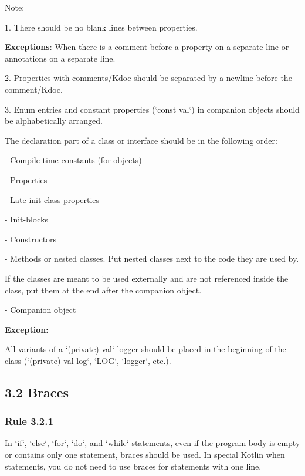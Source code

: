 Note:

1.	There should be no blank lines between properties. 

\textbf{Exceptions}: When there is a comment before a property on a separate line or annotations on a separate line.

2.	Properties with comments/Kdoc should be separated by a newline before the comment/Kdoc.

3.	Enum entries and constant properties (`const val`) in companion objects should be alphabetically arranged.



The declaration part of a class or interface should be in the following order:

- Compile-time constants (for objects)

- Properties

- Late-init class properties

- Init-blocks

- Constructors

- Methods or nested classes. Put nested classes next to the code they are used by.

If the classes are meant to be used externally and are not referenced inside the class, put them at the end after the companion object.

- Companion object



\textbf{Exception:}

All variants of a `(private) val` logger should be placed in the beginning of the class (`(private) val log`, `LOG`, `logger`, etc.).



\subsection*{\textbf{3.2 Braces}}

\subsubsection*{\textbf{Rule 3.2.1}}
\leavevmode\newline



In `if`, `else`, `for`, `do`, and `while` statements, even if the program body is empty or contains only one statement, braces should be used. In special Kotlin when statements, you do not need to use braces for statements with one line. 



